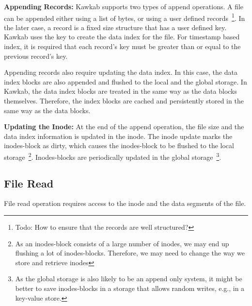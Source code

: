 \documentclass[]{article}
\newcommand{\subtopic}[1]{\vspace{1.5pt} \noindent \textbf{#1}}
\begin{document}
\subtopic{Appending Records:} Kawkab supports two types of append operations. A
file can be appended either using a list of bytes, or using a user defined
records~\footnote{Todo: How to ensure that the records are well structured?}.
In the later case, a record is a fixed size structure that has a user defined
key. Kawkab uses the key to create the data index for the file. For timestamp
based index, it is required that each record's key must be greater than or
equal to the previous record's key.

Appending records also require updating the data index. In this case, the
data index blocks are also appended and flushed to the local and the
global storage. In Kawkab, the data index blocks are treated in the
same way as the data blocks themselves. Therefore, the index blocks
are cached and persistently stored in the same way as the data blocks.


\subtopic{Updating the Inode:} At the end of the append operation, the file
size and the data index information is updated in the inode. The inode
update marks the inodes-block as dirty, which causes the inodes-block
to be flushed to the local storage~\footnote{As an inodes-block consists of
a large number of inodes, we may end up flushing a lot of inodes-blocks. Therefore,
we may need to change the way we store and retrieve inodes}. Inodes-blocks
are periodically updated in the global storage~\footnote{As the global storage
is also likely to be an append only system, it might be better to save inodes-blocks
in a storage that allows random writes, e.g., in a key-value store.}.




\subsection{File Read}

File read operation requires access to the inode and the data segments of the
file. 
\end{document}
